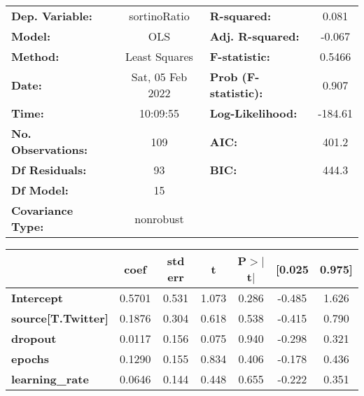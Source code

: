 \begin{center}
\begin{tabular}{lclc}
\toprule
\textbf{Dep. Variable:}              &   sortinoRatio   & \textbf{  R-squared:         } &     0.081   \\
\textbf{Model:}                      &       OLS        & \textbf{  Adj. R-squared:    } &    -0.067   \\
\textbf{Method:}                     &  Least Squares   & \textbf{  F-statistic:       } &    0.5466   \\
\textbf{Date:}                       & Sat, 05 Feb 2022 & \textbf{  Prob (F-statistic):} &    0.907    \\
\textbf{Time:}                       &     10:09:55     & \textbf{  Log-Likelihood:    } &   -184.61   \\
\textbf{No. Observations:}           &         109      & \textbf{  AIC:               } &     401.2   \\
\textbf{Df Residuals:}               &          93      & \textbf{  BIC:               } &     444.3   \\
\textbf{Df Model:}                   &          15      & \textbf{                     } &             \\
\textbf{Covariance Type:}            &    nonrobust     & \textbf{                     } &             \\
\bottomrule
\end{tabular}
\begin{tabular}{lcccccc}
                                     & \textbf{coef} & \textbf{std err} & \textbf{t} & \textbf{P$> |$t$|$} & \textbf{[0.025} & \textbf{0.975]}  \\
\midrule
\textbf{Intercept}                   &       0.5701  &        0.531     &     1.073  &         0.286        &       -0.485    &        1.626     \\
\textbf{source[T.Twitter]}           &       0.1876  &        0.304     &     0.618  &         0.538        &       -0.415    &        0.790     \\
\textbf{dropout}                     &       0.0117  &        0.156     &     0.075  &         0.940        &       -0.298    &        0.321     \\
\textbf{epochs}                      &       0.1290  &        0.155     &     0.834  &         0.406        &       -0.178    &        0.436     \\
\textbf{learning\_rate}              &       0.0646  &        0.144     &     0.448  &         0.655        &       -0.222    &        0.351     \\

\end{tabular}
\end{center}
